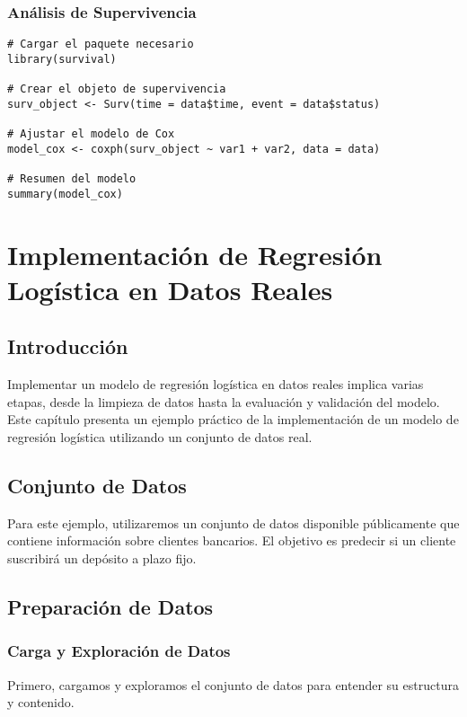 \documentclass[a4paper]{report} %
\begin{document}
\subsection{An\'alisis de Supervivencia}

\begin{verbatim}
# Cargar el paquete necesario
library(survival)

# Crear el objeto de supervivencia
surv_object <- Surv(time = data$time, event = data$status)

# Ajustar el modelo de Cox
model_cox <- coxph(surv_object ~ var1 + var2, data = data)

# Resumen del modelo
summary(model_cox)
\end{verbatim}



\chapter{Implementaci\'on de Regresi\'on Log\'istica en Datos Reales}
\section{Introducci\'on}

Implementar un modelo de regresi\'on log\'istica en datos reales implica varias etapas, desde la limpieza de datos hasta la evaluaci\'on y validaci\'on del modelo. Este cap\'itulo presenta un ejemplo pr\'actico de la implementaci\'on de un modelo de regresi\'on log\'istica utilizando un conjunto de datos real.

\section{Conjunto de Datos}

Para este ejemplo, utilizaremos un conjunto de datos disponible p\'ublicamente que contiene informaci\'on sobre clientes bancarios. El objetivo es predecir si un cliente suscribir\'a un dep\'osito a plazo fijo.

\section{Preparaci\'on de Datos}

\subsection{Carga y Exploraci\'on de Datos}

Primero, cargamos y exploramos el conjunto de datos para entender su estructura y contenido.
\end{document}
